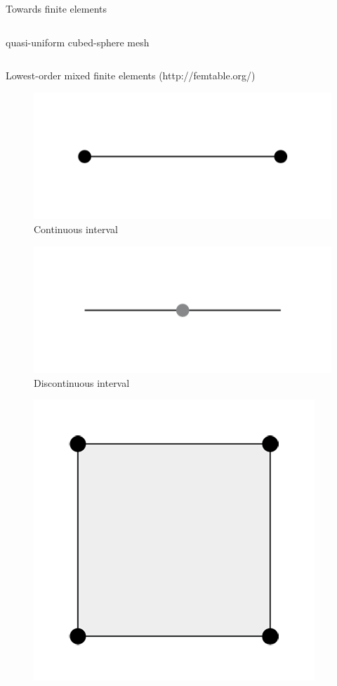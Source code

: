 \documentclass[9pt]{beamer}
\begin{document}
\begin{frame}[c]{Towards finite elements}
\begin{columns}
\begin{column}{0.5\textwidth}
\begin{center}
			quasi-uniform cubed-sphere mesh
		\end{center}
	\end{column}
\end{columns}
\end{frame}

\begin{frame}[c]{Lowest-order mixed finite elements (http://femtable.org/)}
	\vspace{-2.5mm}
	\begin{center}
		\begin{minipage}{0.5\textwidth}
			\centering
			\begin{figure}
				\includegraphics[width=0.5\linewidth]{figures/Q1_interval}
				\caption*{Continuous interval}
			\end{figure}
		\end{minipage}%
		\begin{minipage}{0.5\textwidth}
			\centering
			\begin{figure}
				\includegraphics[width=0.5\linewidth]{figures/dQ0_interval}
				\caption*{Discontinuous interval}
			\end{figure}
		\end{minipage}
	\end{center}%
	\begin{center}\vspace{-5mm}
		\begin{minipage}{0.33\textwidth}
			\centering
			\begin{figure}
				\includegraphics[width=0.7\linewidth]{figures/Q1_quadrilateral}

\end{figure}
\end{minipage}
\end{center}
\end{frame}
\end{document}

